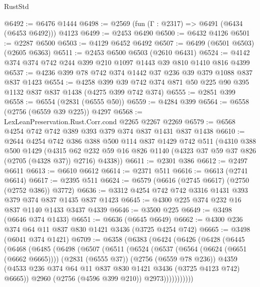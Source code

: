 \begin{lexlean}{RustStd}
\begin{coremodule}
@6492 := @6476 @1444
@6498 := @2569 (fun (Γ : @2317) => @6491 (@6434 (@6453 @6492))) @4123
@6499 := @2453 @6490
@6500 := @6432 @4126
@6501 := @2287 @6500
@6503 := @4129 @6452 @6492
@6507 := @6499 (@6501 @6503) (@2605 @6363)
@6511 := @2453 @6500 @6503 (@2610 @6431)
@6524 := @4142 @374 @374 @742 @244 @399 @210 @1097 @1443 @39 @810 @1410 @816 @4399
@6537 := @4236 @399 @78 @742 @374 @1442 @37 @236 @39 @379 @1088 @837 @837 @1423
@6554 := @4258
    @399
    @39
    @742
    @374
    @871
    @50
    @225
    @90
    @395
    @1132
    @837
    @837
    @1438
    (@4275 @399 @742 @374)
@6555 := @2851 @399
@6558 := @6554 (@2831 (@6555 @50))
@6559 := @4284 @399
@6564 := @6558 (@2756 (@6559 @39 @225)) @4297
@6568 := LexLeanPreservation.Rust.Corr.cond @2265 @2267 @2269
@6579 := @6568 @4254 @742 @742 @389 @393 @379 @374 @837 @1431 @837 @1438
@6610 := @2644
    @4254
    @742
    @386
    @388
    @500
    @114
    @837
    @1429
    @742
    @511
    (@4310
      @388
      @500
      @1429
      (@4315 @62 @232 @59 @16 @826 @1140 (@4323 @37 @59 @37 @826 (@2705 (@4328 @37)) @2716) @4338))
@6611 := @2301 @386
@6612 := @2497 @6611
@6613 := @6610 @6612
@6614 := @2371 @511
@6616 := @6613 (@2741 @6614)
@6617 := @2395 @511
@6624 := @6579 (@6616 (@2745 @6617) (@2750 (@2752 @386)) @3772)
@6636 := @3312 @4254 @742 @742 @3316 @1431 @393 @379 @374 @837 @1435 @837 @1423
@6645 := @4300 @225 @374 @232 @16 @837 @1140 @1433 @3437 @4339
@6646 := @3500 @225
@6649 := @3498 (@6646 @374 @1433)
@6651 := @6636 (@6645 @6649)
@6662 := @4300 @236 @374 @64 @11 @837 @830 @1421 @3436 (@3725 @4254 @742)
@6665 := @3498 (@6041 @374 @1421)
@6709 := @6358
    (@6383
      (@6424
        (@6426
          (@6428
            (@6445
              (@6468
                (@6485
                  (@6498
                    (@6507
                      (@6511
                        (@6524
                          (@6537
                            (@6564 (@6624 (@6651 (@6662 @6665))))
                            (@2831 (@6555 @37))
                            (@2756 (@6559 @78 @236))
                            @4359
                            (@4533
                              @236
                              @374
                              @64
                              @11
                              @837
                              @830
                              @1421
                              @3436
                              (@3725 @4123 @742)
                              @6665))
                          @2960
                          (@2756 (@4596 @399 @210))
                          @2973)))))))))))

\end{coremodule}
\end{lexlean}
